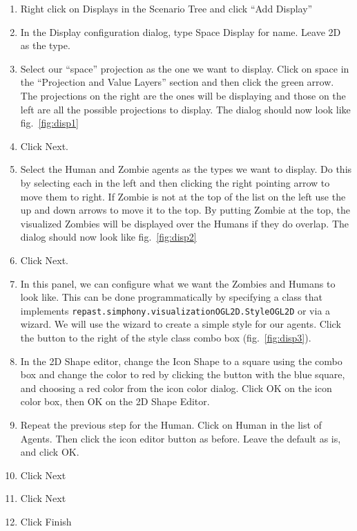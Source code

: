 \documentclass[11pt]{amsart}
\begin{document}
\vspace{.2in}
\begin{enumerate}
\item Right click on Displays in the Scenario Tree and click ``Add Display''
\item In the Display configuration dialog, type Space Display for name. Leave 2D as the type.
\item Select our ``space'' projection as the one we want to display. Click on space in the ``Projection and Value Layers'' section and then click the green arrow. The projections on the right are the ones will be displaying and those on the left are all the possible projections to display. The dialog should now look like fig.~\ref{fig:disp1}
\item Click Next.
\item Select the Human and Zombie agents as the types we want to display. Do this by selecting each in the left and then clicking the right pointing arrow to move them to right. If Zombie is not at the top of the list on the left use the up and down arrows to move it to the top. By putting Zombie at the top, the visualized Zombies will be displayed over the Humans if they do overlap.  The dialog should now look like fig.~\ref{fig:disp2}
\item Click Next.
\item In this panel, we can configure what we want the Zombies and Humans to look like. This can be done programmatically by specifying a class that implements \texttt{repast.simphony.visualizationOGL2D.StyleOGL2D} or via a wizard. We will use the wizard to create a simple style for our agents. Click the button to the right of the style class combo box (fig.~\ref{fig:disp3}).
\item In the 2D Shape editor, change the Icon Shape to a square using the combo box and change the color to red by clicking the button with the blue square, and choosing a red color from the icon color dialog. Click OK on the icon color box, then OK on the 2D Shape Editor.
\item Repeat the previous step for the Human. Click on Human in the list of Agents. Then click the icon editor button as before. Leave the default as is, and click OK. 
\item Click Next
\item Click Next
\item Click Finish
\end{enumerate}
\vspace{.2in}
\end{document}
